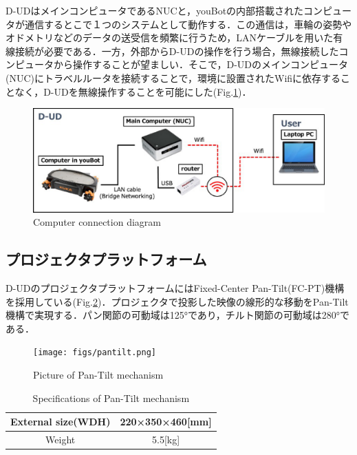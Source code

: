 \documentclass[12pt]{sonota/aislab}
\begin{document}
D-UDはメインコンピュータであるNUCと，youBotの内部搭載されたコンピュータが通信するとこで１つのシステムとして動作する．この通信は，車輪の姿勢やオドメトリなどのデータの送受信を頻繁に行うため，LANケーブルを用いた有線接続が必要である．一方，外部からD-UDの操作を行う場合，無線接続したコンピュータから操作することが望ましい．そこで，D-UDのメインコンピュータ(NUC)にトラベルルータを接続することで，環境に設置されたWifiに依存することなく，D-UDを無線操作することを可能にした(Fig.\ref{computer_connection})．

\begin{figure}[h]
\begin{center}
\includegraphics[clip, width=12cm]{figs/computer_cinfiguration.eps}
\caption{Computer connection diagram}
\label{computer_connection}
\end{center}
\end{figure}

\subsection{プロジェクタプラットフォーム}
D-UDのプロジェクタプラットフォームにはFixed-Center Pan-Tilt(FC-PT)機構を採用している(Fig.\ref{pantilt})\cite{pantilt}．プロジェクタで投影した映像の線形的な移動をPan-Tilt機構で実現する．パン関節の可動域は125°であり，チルト関節の可動域は280°である．

\begin{figure}[h]
\begin{center}
\texttt{[image: figs/pantilt.png]}
\caption{Picture of Pan-Tilt mechanism}
\label{pantilt}
\end{center}
\end{figure}

\begin{table}[h]
	\caption{Specifications of Pan-Tilt mechanism}
	\label{table:pantilt}
	\centering 
	\begin{tabular}[tbp]{|c|c|}
		\hline 
		External size(WDH) & 220×350×460[mm] \\\hline
		Weight & 5.5[kg] \\\hline
	\end{tabular}
\end{table}
\end{document}
